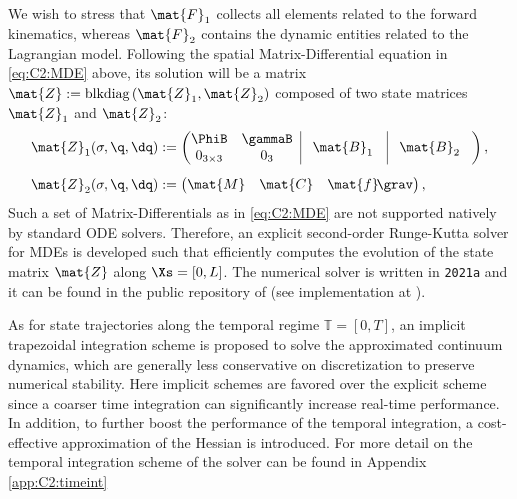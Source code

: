 %
%   
%
We wish to stress that $\mat{F}_1$ collects all elements related to the forward kinematics, whereas $\mat{F}_2$ contains the dynamic entities related to the Lagrangian model. Following the spatial Matrix-Differential equation in \eqref{eq:C2:MDE} above, its solution will be a matrix $\mat{Z} := \text{blkdiag}\left( \mat{Z}_1, \mat{Z}_2 \right)$ composed of two state matrices $\mat{Z}_1$ and $\mat{Z}_2$:
%
\begin{align}
\mat{Z}_1(\sigma,\q,\dq) & := \begin{pmatrix}
\begin{matrix}
\PhiB  & \gammaB \\ 0_{3\times3} &  0_{3}
\end{matrix} \;\; \vrule & \!\mat{B}_1 & \vrule & \!\mat{B}_2 \;\;\;
 \end{pmatrix}, \\[0.5em]
\mat{Z}_2(\sigma,\q,\dq) & := \begin{pmatrix} \mat{M} & \mat{C} & \mat{f}\!\grav \end{pmatrix},
\end{align}
%
Such a set of Matrix-Differentials as in \eqref{eq:C2:MDE} are not supported natively by standard ODE solvers. Therefore, an explicit second-order Runge-Kutta solver for MDEs is developed such that efficiently computes the evolution of the state matrix $\mat{Z}$ along $\Xs = [0,L]$. The numerical solver is written in \matlab \texttt{2021a} and it can be found in the public repository of \sorotoki (see implementation at \cite{SorotokiCode}).

As for state trajectories along the temporal regime $\mathbb{T} = [0,T]$, an implicit trapezoidal integration scheme is proposed to solve the approximated continuum dynamics, which are generally less conservative on discretization to preserve numerical stability. Here implicit schemes are favored over the explicit scheme since a coarser time integration can significantly increase real-time performance. In addition, to further boost the performance of the temporal integration, a cost-effective approximation of the Hessian is introduced. For more detail on the temporal integration scheme of the solver can be found in Appendix \ref{app:C2:timeint}
